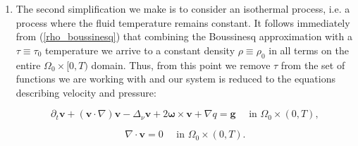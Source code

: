 \documentclass[12pt]{report}
\numberwithin{theorem}{chapter}
\numberwithin{corollary}{chapter}
\numberwithin{lemma}{chapter}
\numberwithin{remark}{chapter}
\numberwithin{definition}{chapter}
\numberwithin{prop}{chapter}
\begin{document}
\begin{enumerate}
\begin{equation} \label{original_general_NS_boussinesq}
  \partial_t \mathbf{v} + (\mathbf{v} \cdot \nabla)\mathbf{v} -\Delta_{\nu} \mathbf{v} + 2 \mathbf{\omega} \times \mathbf{v} + \nabla q = \rho \mathbf{g} \quad \text{ in } \Omega_0 \times (0,T),
\end{equation}

\begin{equation} \label{original_general_mass_cons_boussinesq}
  \nabla \cdot \mathbf{v}  = 0 \quad \text{ in } \Omega_0 \times (0,T),
\end{equation}

\begin{equation} \label{original_general_temperature_boussinesq}
  \partial_t \tau + \mathbf{v} \nabla \tau = k \Delta \tau + Q \quad \text{ in } \Omega_0 \times (0,T),
\end{equation}

\begin{equation}\label{rho_boussinesq}
  \rho = \rho_0 - \Xi \rho_0(\tau-\tau_0) \quad \text{ in } \Omega_0 \times (0,T).
\end{equation}

\item The second simplification we make is to consider an isothermal process, i.e. a process where the fluid temperature remains constant. It follows immediately from (\ref{rho_boussinesq}) that combining the Boussinesq approximation with a $\tau \equiv \tau_0$ temperature we arrive to a constant density $\rho \equiv \rho_0$ in all terms on the entire $\Omega_0 \times [0,T)$ domain. Thus, from this point we remove $\tau$ from the set of functions we are working with and our system is reduced to the equations describing velocity and pressure:

\begin{equation} \label{original_general_NS_isothermal}
  \partial_t \mathbf{v} + (\mathbf{v} \cdot \nabla)\mathbf{v} -\Delta_{\nu} \mathbf{v} + 2 \mathbf{\omega} \times \mathbf{v} + \nabla q = \mathbf{g} \quad \text{ in } \Omega_0 \times (0,T),
\end{equation}

\begin{equation} \label{original_general_mass_cons_isothermal}
  \nabla \cdot \mathbf{v}  = 0 \quad \text{ in } \Omega_0 \times (0,T).
\end{equation}


\end{enumerate}
\end{document}
